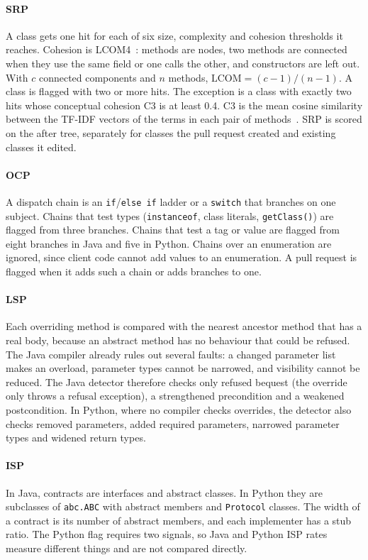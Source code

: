 \documentclass[sigconf]{acmart}
\begin{document}
\paragraph{SRP} A class gets one hit for each of six size, complexity and cohesion thresholds it
reaches. Cohesion is LCOM4~\cite{hitz1995cohesion}: methods are nodes, two methods are connected when
they use the same field or one calls the other, and constructors are left out. With $c$ connected
components and $n$ methods, $\text{LCOM} = (c-1)/(n-1)$. A class is flagged with two or more hits.
The exception is a class with exactly two hits whose conceptual cohesion C3 is at least 0.4. C3 is the
mean cosine similarity between the TF-IDF vectors of the terms in each pair of methods~\cite{marcus2008c3}.
SRP is scored on the after tree, separately for classes the pull request created and existing
classes it edited.

\paragraph{OCP} A dispatch chain is an \texttt{if}/\texttt{else if} ladder or a \texttt{switch}
that branches on one subject. Chains that test types (\texttt{instanceof}, class literals,
\texttt{getClass()}) are flagged from three branches. Chains that test a tag or value are flagged
from eight branches in Java and five in Python. Chains over an enumeration are ignored, since client
code cannot add values to an enumeration. A pull request is flagged when it adds such a chain or adds
branches to one.

\paragraph{LSP} Each overriding method is compared with the nearest ancestor method that has a real
body, because an abstract method has no behaviour that could be refused. The Java compiler already
rules out several faults: a changed parameter list makes an overload, parameter types cannot be
narrowed, and visibility cannot be reduced. The Java detector therefore checks only refused bequest
(the override only throws a refusal exception), a strengthened precondition and a weakened
postcondition. In Python, where no compiler checks overrides, the detector also checks removed
parameters, added required parameters, narrowed parameter types and widened return types.

\paragraph{ISP} In Java, contracts are interfaces and abstract classes. In Python they are subclasses
of \texttt{abc.ABC} with abstract members and \texttt{Protocol} classes. The width of a contract is
its number of abstract members, and each implementer has a stub ratio. The Python flag requires two
signals, so Java and Python ISP rates measure different things and are not compared directly.
\end{document}
